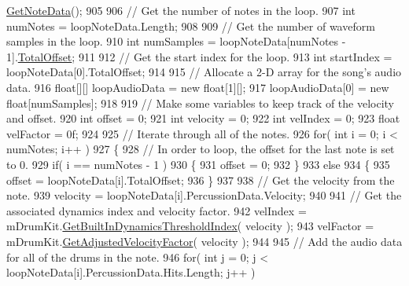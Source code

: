 \begin{DoxyCodeInclude}
      \hyperlink{group___song_pub_func_gae3df1fd5448b7d9cefb0fed4af967985}{GetNoteData}();
905 
906         \textcolor{comment}{// Get the number of notes in the loop.}
907         \textcolor{keywordtype}{int} numNotes = loopNoteData.Length;
908 
909         \textcolor{comment}{// Get the number of waveform samples in the loop.}
910         \textcolor{keywordtype}{int} numSamples = loopNoteData[numNotes - 1].\hyperlink{group___song_structs_a9a0f4830f464d3c7e7f4f156ce490cec}{TotalOffset};
911 
912         \textcolor{comment}{// Get the start index for the loop.}
913         \textcolor{keywordtype}{int} startIndex = loopNoteData[0].TotalOffset;
914 
915         \textcolor{comment}{// Allocate a 2-D array for the song's audio data.}
916         \textcolor{keywordtype}{float}[][] loopAudioData = \textcolor{keyword}{new} \textcolor{keywordtype}{float}[1][];
917         loopAudioData[0] = \textcolor{keyword}{new} \textcolor{keywordtype}{float}[numSamples];
918 
919         \textcolor{comment}{// Make some variables to keep track of the velocity and offset.}
920         \textcolor{keywordtype}{int} offset = 0;
921         \textcolor{keywordtype}{int} velocity = 0;
922         \textcolor{keywordtype}{int} velIndex = 0;
923         \textcolor{keywordtype}{float} velFactor = 0f;
924 
925         \textcolor{comment}{// Iterate through all of the notes.}
926         \textcolor{keywordflow}{for}( \textcolor{keywordtype}{int} i = 0; i < numNotes; i++ )
927         \{
928             \textcolor{comment}{// In order to loop, the offset for the last note is set to 0.}
929             \textcolor{keywordflow}{if}( i == numNotes - 1 )
930             \{
931                 offset = 0;
932             \}
933             \textcolor{keywordflow}{else}
934             \{
935                 offset = loopNoteData[i].TotalOffset;
936             \}
937             
938             \textcolor{comment}{// Get the velocity from the note.}
939             velocity = loopNoteData[i].PercussionData.Velocity;
940 
941             \textcolor{comment}{// Get the associated dynamics index and velocity factor.}
942             velIndex = mDrumKit.\hyperlink{group___v_i_base_pub_func_gacddf07c08c3a8154a6934be22f539788}{GetBuiltInDynamicsThresholdIndex}( velocity 
      );
943             velFactor = mDrumKit.\hyperlink{group___v_i_base_pub_func_gae638c68bd0e79d0b99495be69e50f49d}{GetAdjustedVelocityFactor}( velocity );
944 
945             \textcolor{comment}{// Add the audio data for all of the drums in the note.}
946             \textcolor{keywordflow}{for}( \textcolor{keywordtype}{int} j = 0; j < loopNoteData[i].PercussionData.Hits.Length; j++ )

\end{DoxyCodeInclude}
